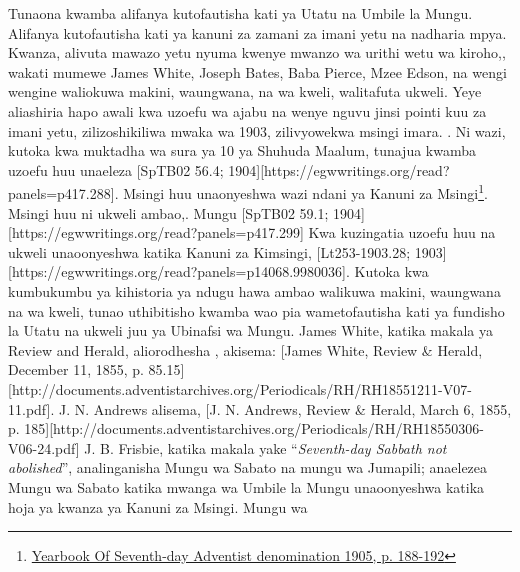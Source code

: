 Tunaona kwamba alifanya kutofautisha kati ya Utatu na Umbile la Mungu. Alifanya kutofautisha kati ya kanuni za zamani za imani yetu na nadharia mpya. Kwanza, alivuta mawazo yetu nyuma kwenye mwanzo wa urithi wetu wa kiroho,, wakati mumewe James White, Joseph Bates, Baba Pierce, Mzee Edson, na wengi wengine waliokuwa makini, waungwana, na wa kweli, walitafuta ukweli. Yeye aliashiria hapo awali kwa uzoefu wa ajabu na wenye nguvu jinsi pointi kuu za imani yetu, zilizoshikiliwa mwaka wa 1903, zilivyowekwa msingi imara.   . Ni wazi, kutoka kwa muktadha wa sura ya 10 ya Shuhuda Maalum, tunajua kwamba uzoefu huu unaeleza [SpTB02 56.4; 1904][https://egwwritings.org/read?panels=p417.288]. Msingi huu unaonyeshwa wazi ndani ya Kanuni za Msingi\footnote{\href{https://static1.squarespace.com/static/554c4998e4b04e89ea0c4073/t/59d17e24c027d84167e17617/1506901547915/SDA-YB1905+\%28P.+188-192\%29.pdf}{Yearbook Of Seventh-day Adventist denomination 1905, p. 188-192}}. Msingi huu ni ukweli ambao,. Mungu [SpTB02 59.1; 1904][https://egwwritings.org/read?panels=p417.299] Kwa kuzingatia uzoefu huu na ukweli unaoonyeshwa katika Kanuni za Kimsingi, [Lt253-1903.28; 1903][https://egwwritings.org/read?panels=p14068.9980036]. Kutoka kwa kumbukumbu ya kihistoria ya ndugu hawa ambao walikuwa makini, waungwana na wa kweli, tunao uthibitisho kwamba wao pia wametofautisha kati ya fundisho la Utatu na ukweli juu ya Ubinafsi wa Mungu. James White, katika makala ya Review and Herald, aliorodhesha , akisema: [James White, Review \& Herald, December 11, 1855, p. 85.15][http://documents.adventistarchives.org/Periodicals/RH/RH18551211-V07-11.pdf]. J. N. Andrews alisema, [J. N. Andrews, Review \& Herald, March 6, 1855, p. 185][http://documents.adventistarchives.org/Periodicals/RH/RH18550306-V06-24.pdf] J. B. Frisbie, katika makala yake “\textit{Seventh-day Sabbath not abolished}”, analinganisha Mungu wa Sabato na mungu wa Jumapili; anaelezea Mungu wa Sabato katika mwanga wa Umbile la Mungu unaoonyeshwa katika hoja ya kwanza ya Kanuni za Msingi. Mungu wa 